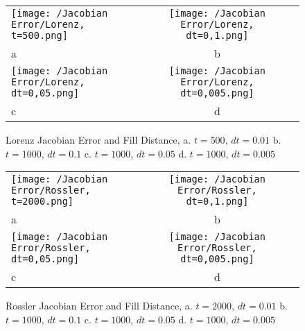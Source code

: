 \appendix
%
%

\chapter{}

\begin{figure}[H]
    \centering
    \begin{tabular}{lcc}
        \texttt{[image: /Jacobian Error/Lorenz, t=500.png]}&
        \texttt{[image: /Jacobian Error/Lorenz, dt=0,1.png]}\\
        \hfil a &b\\
        \texttt{[image: /Jacobian Error/Lorenz, dt=0,05.png]}&
        \texttt{[image: /Jacobian Error/Lorenz, dt=0,005.png]}\\
        \hfil c &d\\
    \end{tabular}
    \caption{Lorenz Jacobian Error and Fill Distance, a. $t=500$, $dt=0.01$ b. $t=1000$, $dt=0.1$ c. $t=1000$, $dt=0.05$ d. $t=1000$, $dt=0.005$}\label{fig:lorenzjac2}
\end{figure}

\begin{figure}[H]
    \centering
    \begin{tabular}{lcc}
        \texttt{[image: /Jacobian Error/Rossler, t=2000.png]}&
        \texttt{[image: /Jacobian Error/Rossler, dt=0,1.png]}\\
        \hfil a &b\\
        \texttt{[image: /Jacobian Error/Rossler, dt=0,05.png]}&
        \texttt{[image: /Jacobian Error/Rossler, dt=0,005.png]}\\
        \hfil c &d\\
    \end{tabular}
    \caption{Rossler Jacobian Error and Fill Distance, a. $t=2000$, $dt=0.01$ b. $t=1000$, $dt=0.1$ c. $t=1000$, $dt=0.05$ d. $t=1000$, $dt=0.005$}\label{fig:rosslerjac2}
\end{figure}

